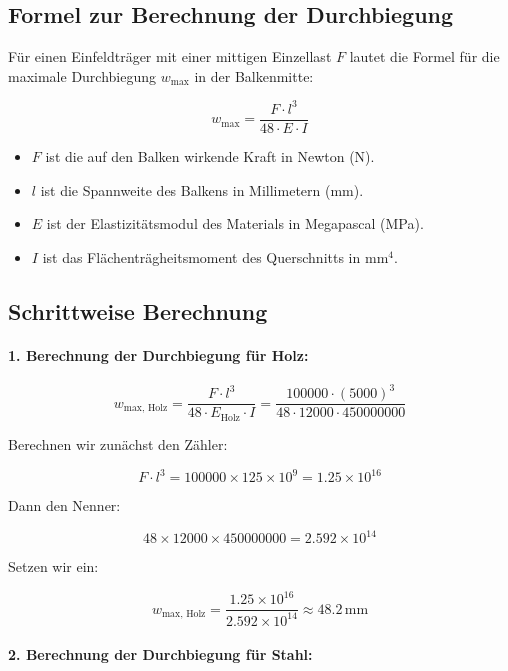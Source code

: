 	\subsection*{Formel zur Berechnung der Durchbiegung}
	
	Für einen Einfeldträger mit einer mittigen Einzellast \( F \) lautet die Formel für die maximale Durchbiegung \( w_{\text{max}} \) in der Balkenmitte:
	
	\[
	w_{\text{max}} = \frac{F \cdot l^3}{48 \cdot E \cdot I}
	\]
	
	\begin{itemize}
		\item \( F \) ist die auf den Balken wirkende Kraft in Newton (N).
		\item \( l \) ist die Spannweite des Balkens in Millimetern (mm).
		\item \( E \) ist der Elastizitätsmodul des Materials in Megapascal (MPa).
		\item \( I \) ist das Flächenträgheitsmoment des Querschnitts in \(\mathrm{mm}^4\).
	\end{itemize}
	
	\subsection*{Schrittweise Berechnung}
	
	\paragraph{1. Berechnung der Durchbiegung für Holz:}
	
	\[
	w_{\text{max, Holz}} = \frac{F \cdot l^3}{48 \cdot E_{\text{Holz}} \cdot I}
	= \frac{100000 \cdot (5000)^3}{48 \cdot 12000 \cdot 450000000}
	\]
	
	Berechnen wir zunächst den Zähler:
	
	\[
	F \cdot l^3 = 100000 \times 125 \times 10^9 = 1.25 \times 10^{16}
	\]
	
	Dann den Nenner:
	
	\[
	48 \times 12000 \times 450000000 = 2.592 \times 10^{14}
	\]
	
	Setzen wir ein:
	
	\[
	w_{\text{max, Holz}} = \frac{1.25 \times 10^{16}}{2.592 \times 10^{14}} \approx 48.2\, \mathrm{mm}
	\]
	
	\paragraph{2. Berechnung der Durchbiegung für Stahl:}
	
